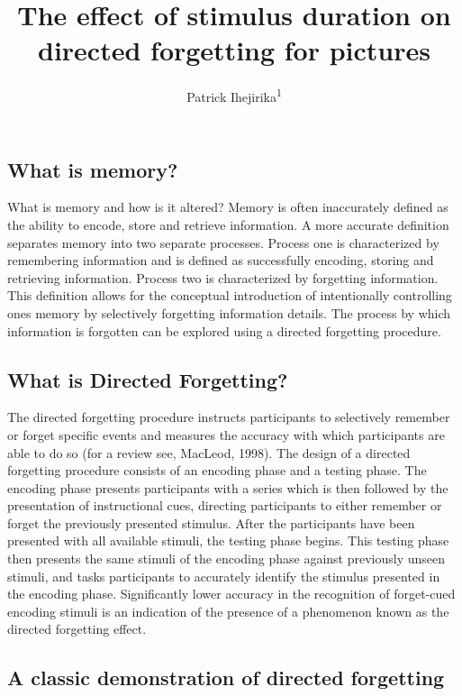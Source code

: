 \documentclass[
  english,
  man,floatsintext]{apa6}
\title{The effect of stimulus duration on directed forgetting for pictures}
\author{Patrick Ihejirika\textsuperscript{1}}
\date{}
\affiliation{\vspace{0.5cm}\textsuperscript{1} Brooklyn College of CUNY}
\begin{document}
\maketitle

\hypertarget{what-is-memory}{%
\subsection{What is memory?}\label{what-is-memory}}

What is memory and how is it altered? Memory is often inaccurately defined as the ability to encode, store and retrieve information. A more accurate definition separates memory into two separate processes. Process one is characterized by remembering information and is defined as successfully encoding, storing and retrieving information. Process two is characterized by forgetting information. This definition allows for the conceptual introduction of intentionally controlling ones memory by selectively forgetting information details. The process by which information is forgotten can be explored using a directed forgetting procedure.

\hypertarget{what-is-directed-forgetting}{%
\subsection{What is Directed Forgetting?}\label{what-is-directed-forgetting}}

The directed forgetting procedure instructs participants to selectively remember or forget specific events and measures the accuracy with which participants are able to do so (for a review see, MacLeod, 1998). The design of a directed forgetting procedure consists of an encoding phase and a testing phase. The encoding phase presents participants with a series which is then followed by the presentation of instructional cues, directing participants to either remember or forget the previously presented stimulus. After the participants have been presented with all available stimuli, the testing phase begins. This testing phase then presents the same stimuli of the encoding phase against previously unseen stimuli, and tasks participants to accurately identify the stimulus presented in the encoding phase. Significantly lower accuracy in the recognition of forget-cued encoding stimuli is an indication of the presence of a phenomenon known as the directed forgetting effect.

\hypertarget{a-classic-demonstration-of-directed-forgetting}{%
\subsection{A classic demonstration of directed forgetting}\label{a-classic-demonstration-of-directed-forgetting}}
\end{document}
